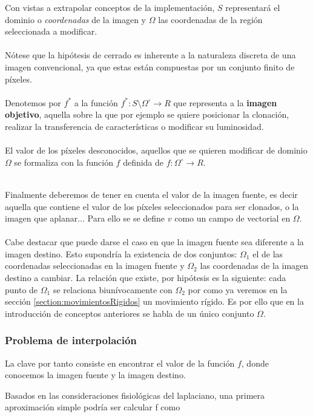 \documentclass[11pt,twoside,titlepage,a4paper]{article}
\numberwithin{equation}{section} %
\theoremstyle{usual}
\begin{document}
 Con vistas a extrapolar conceptos de la implementación, $S$ representará el dominio o \textit{coordenadas} de la imagen y  $\Omega$ las coordenadas de la región seleccionada a modificar.   
\\
\\
Nótese que la hipótesis de cerrado es inherente a la naturaleza discreta de una imagen convencional, ya que estas están compuestas por un conjunto finito de píxeles. 
 \\ \\
Denotemos por $f^*$ a la función $f^*: S \setminus \Omega ^\circ \longrightarrow R$ que representa a la \textbf{imagen objetivo}, aquella sobre la que por ejemplo se quiere posicionar la clonación, realizar la transferencia de características o modificar su luminosidad.
\\ \\
 El valor de los píxeles desconocidos, aquellos que se quieren modificar de dominio $\Omega$ se formaliza con 
 la función $f$  definida de  $f: \Omega ^ \circ \longrightarrow R$.  
 
 \\
Finalmente deberemos de tener en cuenta el valor de la imagen fuente, es decir aquella que contiene el valor de los píxeles seleccionados para ser clonados, o la imagen que aplanar... Para ello se se define $v$ como un campo de vectorial en $\Omega$. 
\\ \\
Cabe destacar que puede darse el caso en que la imagen fuente sea diferente a la imagen destino. Esto supondría la existencia de dos conjuntos: $\Omega_1$ el de las coordenadas seleccionadas en la imagen fuente y $\Omega_2$ las coordenadas de la imagen destino a cambiar. 
La relación que existe, por hipótesis es la siguiente: cada punto de  $\Omega_1$  se relaciona biunívocamente con $\Omega_2$ por como ya veremos en la sección \ref{section:movimientosRigidos} un movimiento rígido. Es por ello que en la introducción de conceptos anteriores se habla de un único conjunto $\Omega$. 

\subsubsection{Problema de interpolación}

La clave por tanto consiste en encontrar el valor de la función $f$, donde conocemos la imagen fuente y la imagen destino. 

Basados en las consideraciones fisiológicas del laplaciano, una primera aproximación simple podría ser calcular f como
\end{document}

